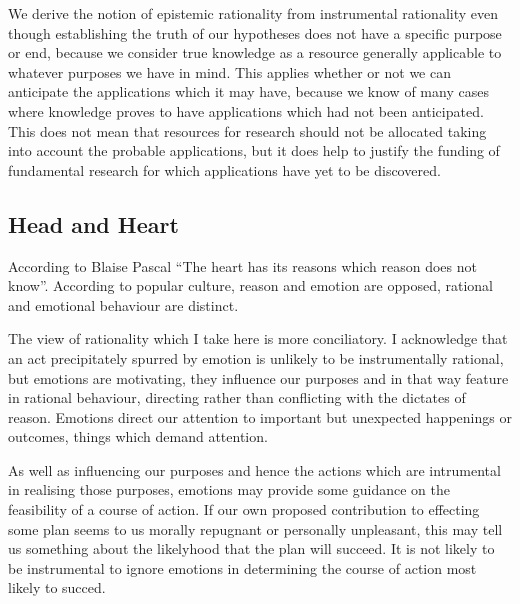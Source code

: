 \documentclass[10pt,titlepage]{article}
\begin{document}
We derive the notion of epistemic rationality from instrumental rationality even though establishing the truth of our hypotheses does not have a specific purpose or end, because we consider true knowledge as a resource generally applicable to whatever purposes we have in mind.
This applies whether or not we can anticipate the applications which it may have, because we know of many cases where knowledge proves to have applications which had not been anticipated.
This does not mean that resources for research should not be allocated taking into account the probable applications, but it does help to justify the funding of fundamental research for which applications have yet to be discovered.

\subsection{Head and Heart}

According to Blaise Pascal ``The heart has its reasons which reason does not know''.
According to popular culture, reason and emotion are opposed, rational and emotional behaviour are distinct.

The view of rationality which I take here is more conciliatory.
I acknowledge that an act precipitately spurred by emotion is unlikely to be instrumentally rational, but emotions are motivating, they influence our purposes and in that way feature in rational behaviour, directing rather than conflicting with the dictates of reason.
Emotions direct our attention to important but unexpected happenings or outcomes, things which demand attention.

As well as influencing our purposes and hence the actions which are intrumental in realising those purposes, emotions may provide some guidance on the feasibility of a course of action.
If our own proposed contribution to effecting some plan seems to us morally repugnant or personally unpleasant, this may tell us something about the likelyhood that the plan will succeed.
It is not likely to be instrumental to ignore emotions in determining the course of action most likely to succed.
\end{document}
